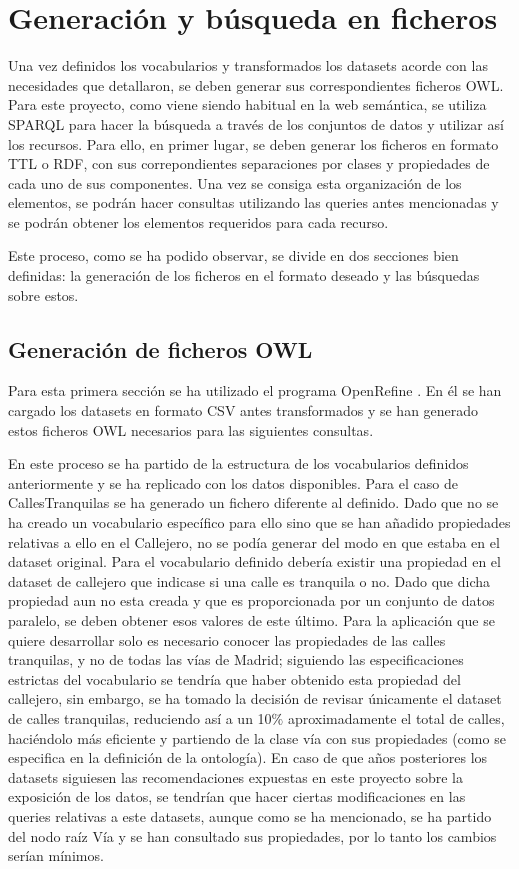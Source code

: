 \chapter{Generación y búsqueda en ficheros}

Una vez definidos los vocabularios y transformados los datasets acorde con las necesidades que detallaron, se deben generar sus correspondientes ficheros OWL.
Para este proyecto, como viene siendo habitual en la web semántica, se utiliza SPARQL para hacer la búsqueda a través de los conjuntos de datos y utilizar así los recursos. Para ello, en primer lugar, se deben generar los ficheros en formato TTL o RDF, con sus correpondientes separaciones por clases y propiedades de cada uno de sus componentes. Una vez se consiga esta organización de los elementos, se podrán hacer consultas utilizando las queries antes mencionadas y se podrán obtener los elementos requeridos para cada recurso.

Este proceso, como se ha podido observar, se divide en dos secciones bien definidas: la generación de los ficheros en el formato deseado y las búsquedas sobre estos.


\section{Generación de ficheros OWL}

Para esta primera sección se ha utilizado el programa OpenRefine \cite{pagPrinc_OpenRefine}. En él se han cargado los datasets en formato CSV antes transformados y se han generado estos ficheros OWL necesarios para las siguientes consultas.

En este proceso se ha partido de la estructura de los vocabularios definidos anteriormente y se ha replicado con los datos disponibles. 
Para el caso de CallesTranquilas se ha generado un fichero diferente al definido. Dado que no se ha creado un vocabulario específico para ello sino que se han añadido propiedades relativas a ello en el Callejero, no se podía generar del modo en que estaba en el dataset original. Para el vocabulario definido debería existir una propiedad en el dataset de callejero que indicase si una calle es tranquila o no. Dado que dicha propiedad aun no esta creada y que es proporcionada por un conjunto de datos paralelo, se deben obtener esos valores de este último. Para la aplicación que se quiere desarrollar solo es necesario conocer las propiedades de las calles tranquilas, y no de todas las vías de Madrid; siguiendo las especificaciones estrictas del vocabulario se tendría que haber obtenido esta propiedad del callejero, sin embargo, se ha tomado la decisión de revisar únicamente el dataset de calles tranquilas, reduciendo así a un 10$\%$ aproximadamente el total de calles, haciéndolo más eficiente y partiendo de la clase vía con sus propiedades (como se especifica en la definición de la ontología). En caso de que años posteriores los datasets siguiesen las recomendaciones expuestas en este proyecto sobre la exposición de los datos, se tendrían que hacer ciertas modificaciones en las queries relativas a este datasets, aunque como se ha mencionado, se ha partido del nodo raíz Vía y se han consultado sus propiedades, por lo tanto los cambios serían mínimos.

